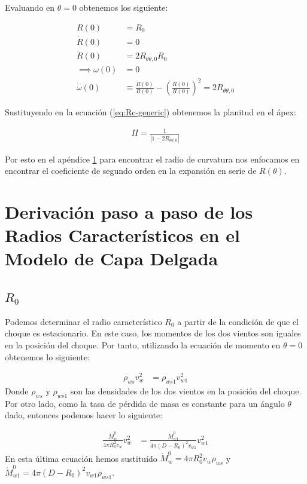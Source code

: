 Evaluando en $\theta = 0$ obtenemos los siguiente:

\begin{align}
  R(0) &= R_0 \\
  \dot{R}(0) &= 0 \\
  \ddot{R}(0) &= 2R_{\theta \theta, 0} R_0 \\
  \implies \omega(0) &= 0 \\
  \dot{\omega}(0) &\equiv \frac{\ddot{R}(0)}{R(0)} - \left(\frac{\dot{R}(0)}{R(0)}\right)^2 = 2R_{\theta \theta, 0}
\end{align}

Sustituyendo en la ecuación (\ref{eq:Rc-generic}) obtenemos la planitud en el ápex:

\begin{align}
  \Pi = \frac{1}{\left|1 - 2R_{\theta \theta, 0}\right|}\label{eq:Rc-nose}
\end{align}

Por esto en el apéndice \ref{app:derivation-radii} para encontrar el radio de curvatura nos enfocamos en encontrar
el coeficiente de segundo orden en la expansión en serie de $R(\theta)$.

\chapter[Derivación de Radios Característicos]{Derivación paso a paso de los Radios Característicos en el Modelo de Capa Delgada}
\label{app:derivation-radii}
\thispagestyle{empty}
\section{$R_0$}
Podemos determinar el radio característico $R_0$ a partir de la condición de que el choque es estacionario. En este caso,
los momentos de los dos vientos son iguales en la posición del choque. Por tanto, utilizando la ecuación de momento en $\theta=0$
obtenemos lo siguiente:

\begin{align}
  \rho_{ws} v^2_w &= \rho_{ws1} v^2_{w1}
\end{align}
Donde $\rho_{ws}$ y $\rho_{ws1}$ son las densidades de los dos vientos en la posición del choque. Por otro lado, como la tasa de pérdida
de masa es constante para un ángulo $\theta$ dado, entonces podemos hacer lo siguiente:

\begin{align}
  \frac{\dot{M}^0_w}{4\pi R_0^2 v_w}v^2_w &= \frac{\dot{M}^0_{w1}}{4\pi\left(D-R_0\right)^2v_{w1}}v^2_{w1} \label{eq:momento-R0-uf}
\end{align}
En esta última ecuación hemos sustituído $\dot{M}^0_w = 4\pi R_0^2 v_w \rho_{ws}$ y \\
$\dot{M}^0_{w1} = 4\pi \left(D - R_0\right)^2 v_{w1} \rho_{ws1}$.

